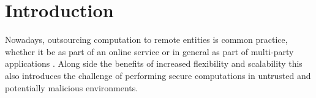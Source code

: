 \section{Introduction}
\label{sec:introduction}
Nowadays, outsourcing computation to remote entities is common practice, whether it be as part of an online service or in general as part of multi-party applications
\cite{UseOfIntelSGX}. Along side the benefits of increased flexibility and scalability this also introduces the challenge of performing secure computations in untrusted
and potentially malicious environments.